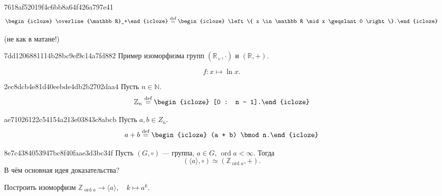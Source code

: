 \begin{note}{7618af52019f4c6bb8a64f426a797e41}
    \[
        \begin{icloze}{2}\overline{\mathbb R}_+\end{icloze} \overset{\text{def}}= \begin{icloze}{1}\left\{ x \in \mathbb R \mid x \geqslant 0 \right\}.\end{icloze}
    \]

    \begin{center}
        \tiny
        (не как в матане!)
    \end{center}
\end{note}

\begin{note}{7dd1206881114b28bc9ef9c14a7fd882}
    Пример изоморфизма групп \({ (\mathbb R_+, \cdot) }\) и \({ (\mathbb R, +) }\).

    \begin{cloze}{1}
        \[
            f : x \mapsto \ln x.
        \]
    \end{cloze}
\end{note}

\begin{note}{2ec8dcb4e81d40eebde4db2b2702daa4}
    Пусть \({ n \in \mathbb N }\).
    \[
        \mathbb Z_{n} \overset{\text{def}}= \begin{icloze}{1}[0 : n - 1].\end{icloze}
    \]
\end{note}

\begin{note}{ae71026122c54154a213e03843c8abcb}
    Пусть \({ a, b \in Z_n }\).
    \[
        a + b \overset{\text{def}}= \begin{icloze}{1}(a + b) \bmod n.\end{icloze}
    \]
\end{note}

\begin{note}{8e7c4384053947bc8f40faae3d3bc34f}
    Пусть \({ (G, \circ)}\) --- группа, \({ a \in G }\), \({ \operatorname{ord} a < \infty }\).
    Тогда
    \[
        (\langle a \rangle, \circ) \simeq (\mathbb Z_{\operatorname{ord} a}, +).
    \]
    В чём основная идея доказательства?

    \begin{cloze}{1}
        Построить изоморфизм \({ \mathbb Z_{\operatorname{ord} a} \to \langle a \rangle, \quad k \mapsto a^{k} }\).
    \end{cloze}
\end{note}


